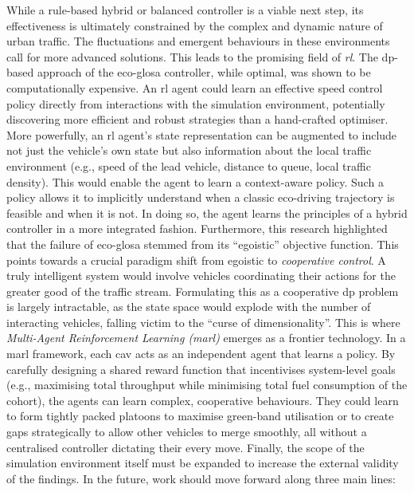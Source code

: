 While a rule-based hybrid or balanced controller is a viable next step, its effectiveness is ultimately constrained by the complex and dynamic nature of urban traffic. The fluctuations and emergent behaviours in these environments call for more advanced solutions. This leads to the promising field of \textit{\acf{rl}}. The \ac{dp}-based approach of the \ac{eco-glosa} controller, while optimal, was shown to be computationally expensive. An \ac{rl} agent could learn an effective speed control policy directly from interactions with the simulation environment, potentially discovering more efficient and robust strategies than a hand-crafted optimiser. More powerfully, an \ac{rl} agent's state representation can be augmented to include not just the vehicle's own state but also information about the local traffic environment (e.g., speed of the lead vehicle, distance to queue, local traffic density). This would enable the agent to learn a context-aware policy. Such a policy allows it to implicitly understand when a classic eco-driving trajectory is feasible and when it is not. In doing so, the agent learns the principles of a hybrid controller in a more integrated fashion.
\mynewline
Furthermore, this research highlighted that the failure of \ac{eco-glosa} stemmed from its \enquote{egoistic} objective function. This points towards a crucial paradigm shift from egoistic to \textit{cooperative control}. A truly intelligent system would involve vehicles coordinating their actions for the greater good of the traffic stream. Formulating this as a cooperative \ac{dp} problem is largely intractable, as the state space would explode with the number of interacting vehicles, falling victim to the \enquote{curse of dimensionality}. This is where \textit{Multi-Agent Reinforcement Learning (\ac{marl})} emerges as a frontier technology. In a \ac{marl} framework, each \ac{cav} acts as an independent agent that learns a policy. By carefully designing a shared reward function that incentivises system-level goals (e.g., maximising total throughput while minimising total fuel consumption of the cohort), the agents can learn complex, cooperative behaviours. They could learn to form tightly packed platoons to maximise green-band utilisation or to create gaps strategically to allow other vehicles to merge smoothly, all without a centralised controller dictating their every move.
\mynewline
Finally, the scope of the simulation environment itself must be expanded to increase the external validity of the findings. In the future, work should move forward along three main lines:
